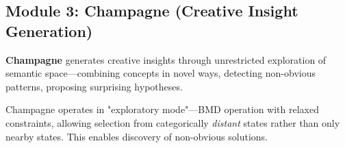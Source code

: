 \subsection{Module 3: Champagne (Creative Insight Generation)}

\begin{definition}
\textbf{Champagne} generates creative insights through unrestricted exploration of semantic space—combining concepts in novel ways, detecting non-obvious patterns, proposing surprising hypotheses.
\end{definition}

\begin{theorem}
Champagne operates in "exploratory mode"—BMD operation with relaxed constraints, allowing selection from categorically \textit{distant} states rather than only nearby states. This enables discovery of non-obvious solutions.
\end{theorem}


